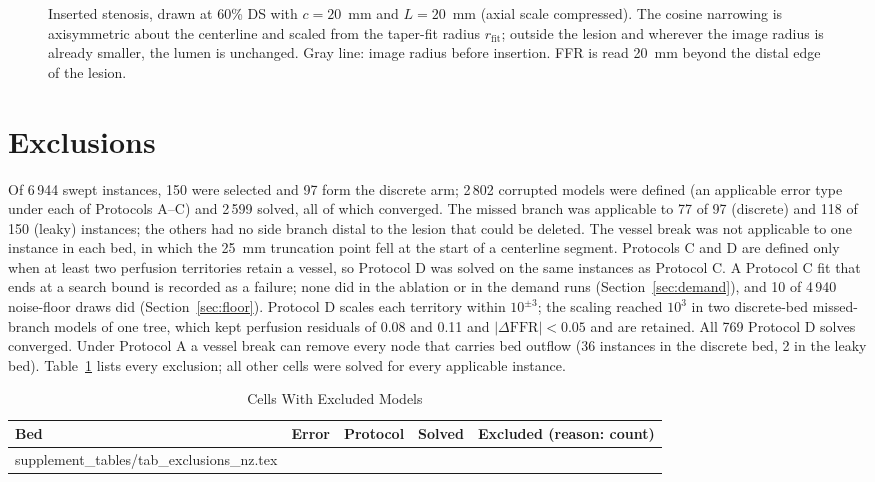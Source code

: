 \documentclass[journal,onecolumn,11pt]{IEEEtran}
\begin{document}
\begin{figure}[!ht]
\caption{Inserted stenosis, drawn at 60\% DS with $c = 20$~mm and $L = 20$~mm (axial scale compressed). The cosine
narrowing is axisymmetric about the centerline and scaled from the taper-fit radius $r_\mathrm{fit}$; outside the
lesion and wherever the image radius is already smaller, the lumen is unchanged. Gray line: image radius before
insertion. FFR is read 20~mm beyond the distal edge of the lesion.}\label{fig:stenosis}
\end{figure}

\FloatBarrier
\section{Exclusions}
Of 6\,944 swept instances, 150 were selected and 97 form the discrete arm; 2\,802 corrupted models were defined
(an applicable error type under each of Protocols A--C) and 2\,599 solved, all of which converged. The missed branch was applicable to 77 of 97 (discrete) and 118 of 150 (leaky)
instances; the others had no side branch distal to the lesion that could be deleted. The vessel break was not
applicable to one instance in each bed, in which the 25~mm truncation point fell at the start of a centerline segment.
Protocols C and D are defined only when at least two perfusion territories retain a vessel, so Protocol D was solved on the same instances as Protocol C. A Protocol C fit that ends at a search bound
is recorded as a failure; none did in the ablation or in the demand runs (Section~\ref{sec:demand}), and 10 of
4\,940 noise-floor draws did (Section~\ref{sec:floor}). Protocol D scales each territory within $10^{\pm 3}$; the
scaling reached $10^3$ in two discrete-bed missed-branch models of one tree, which kept perfusion residuals of 0.08 and
0.11 and $|\Delta\mathrm{FFR}| < 0.05$ and are retained. All 769 Protocol D solves converged. Under Protocol A a vessel break can remove every node that
carries bed outflow (36 instances in the discrete bed, 2 in the leaky bed). Table~\ref{tab:excl} lists every
exclusion; all other cells were solved for every applicable instance.
\begin{table}[!ht]
\caption{Cells With Excluded Models}\label{tab:excl}
\centering\small
\begin{tabular}{@{}lllrl@{}}
\toprule
Bed & Error & Protocol & Solved & Excluded (reason: count)\\
\midrule
{} supplement_tables/tab_exclusions_nz.tex 
\bottomrule
\end{tabular}
\end{table}
\end{document}
